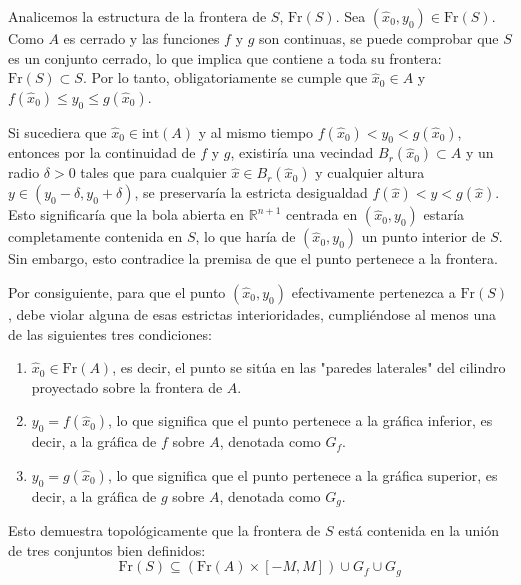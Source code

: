 \documentclass[11pt,letterpaper]{article}
\begin{document}
Analicemos la estructura de la frontera de $S$, $\text{Fr}(S)$. Sea $(\hat{x}_0, y_0) \in \text{Fr}(S)$. Como $A$ es cerrado y las funciones $f$ y $g$ son continuas, se puede comprobar que $S$ es un conjunto cerrado, lo que implica que contiene a toda su frontera: $\text{Fr}(S) \subset S$. Por lo tanto, obligatoriamente se cumple que $\hat{x}_0 \in A$ y $f(\hat{x}_0) \le y_0 \le g(\hat{x}_0)$.

Si sucediera que $\hat{x}_0 \in \text{int}(A)$ y al mismo tiempo $f(\hat{x}_0) < y_0 < g(\hat{x}_0)$, entonces por la continuidad de $f$ y $g$, existiría una vecindad $B_r(\hat{x}_0) \subset A$ y un radio $\delta > 0$ tales que para cualquier $\hat{x} \in B_r(\hat{x}_0)$ y cualquier altura $y \in (y_0 - \delta, y_0 + \delta)$, se preservaría la estricta desigualdad $f(\hat{x}) < y < g(\hat{x})$. Esto significaría que la bola abierta en $\mathbb{R}^{n+1}$ centrada en $(\hat{x}_0, y_0)$ estaría completamente contenida en $S$, lo que haría de $(\hat{x}_0, y_0)$ un punto interior de $S$. Sin embargo, esto contradice la premisa de que el punto pertenece a la frontera.

Por consiguiente, para que el punto $(\hat{x}_0, y_0)$ efectivamente pertenezca a $\text{Fr}(S)$, debe violar alguna de esas estrictas interioridades, cumpliéndose al menos una de las siguientes tres condiciones:
\begin{enumerate}
    \item $\hat{x}_0 \in \text{Fr}(A)$, es decir, el punto se sitúa en las "paredes laterales" del cilindro proyectado sobre la frontera de $A$.
    \item $y_0 = f(\hat{x}_0)$, lo que significa que el punto pertenece a la gráfica inferior, es decir, a la gráfica de $f$ sobre $A$, denotada como $G_f$.
    \item $y_0 = g(\hat{x}_0)$, lo que significa que el punto pertenece a la gráfica superior, es decir, a la gráfica de $g$ sobre $A$, denotada como $G_g$.
\end{enumerate}

Esto demuestra topológicamente que la frontera de $S$ está contenida en la unión de tres conjuntos bien definidos:
\begin{equation*}
\text{Fr}(S) \subseteq (\text{Fr}(A) \times [-M, M]) \cup G_f \cup G_g
\end{equation*}
\end{document}
